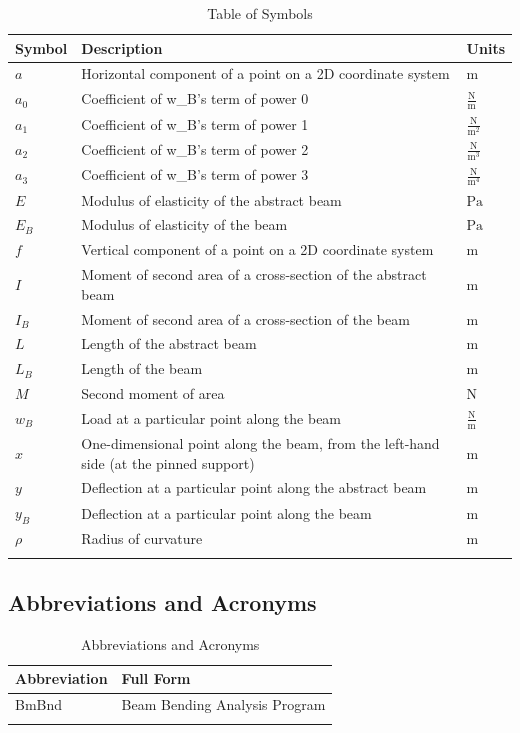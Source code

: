 \documentclass[12pt]{article}
\begin{document}
\begin{longtabu}{l X[l] l}
\toprule
\textbf{Symbol} & \textbf{Description} & \textbf{Units}
\\
\midrule
\endhead
$a$ & Horizontal component of a point on a 2D coordinate system & ${\text{m}}$
\\
${a_{\text{0}}}$ & Coefficient of w\_B's term of power 0 & $\frac{\text{N}}{\text{m}}$
\\
${a_{\text{1}}}$ & Coefficient of w\_B's term of power 1 & $\frac{\text{N}}{\text{m}^{2}}$
\\
${a_{\text{2}}}$ & Coefficient of w\_B's term of power 2 & $\frac{\text{N}}{\text{m}^{3}}$
\\
${a_{\text{3}}}$ & Coefficient of w\_B's term of power 3 & $\frac{\text{N}}{\text{m}^{4}}$
\\
$E$ & Modulus of elasticity of the abstract beam & ${\text{Pa}}$
\\
${E_{B}}$ & Modulus of elasticity of the beam & ${\text{Pa}}$
\\
$f$ & Vertical component of a point on a 2D coordinate system & ${\text{m}}$
\\
$I$ & Moment of second area of a cross-section of the abstract beam & ${\text{m}}$
\\
${I_{B}}$ & Moment of second area of a cross-section of the beam & ${\text{m}}$
\\
$L$ & Length of the abstract beam & ${\text{m}}$
\\
${L_{B}}$ & Length of the beam & ${\text{m}}$
\\
$M$ & Second moment of area & ${\text{N}}$
\\
${w_{B}}$ & Load at a particular point along the beam & $\frac{\text{N}}{\text{m}}$
\\
$x$ & One-dimensional point along the beam, from the left-hand side (at the pinned support) & ${\text{m}}$
\\
$y$ & Deflection at a particular point along the abstract beam & ${\text{m}}$
\\
${y_{B}}$ & Deflection at a particular point along the beam & ${\text{m}}$
\\
$ρ$ & Radius of curvature & ${\text{m}}$
\\
\bottomrule
\caption{Table of Symbols}
\label{Table:ToS}
\end{longtabu}
\subsection{Abbreviations and Acronyms}
\label{Sec:TAbbAcc}
\begin{longtable}{l l}
\toprule
\textbf{Abbreviation} & \textbf{Full Form}
\\
\midrule
\endhead
BmBnd & Beam Bending Analysis Program
\\
\bottomrule
\caption{Abbreviations and Acronyms}
\label{Table:TAbbAcc}
\end{longtable}
\end{document}
